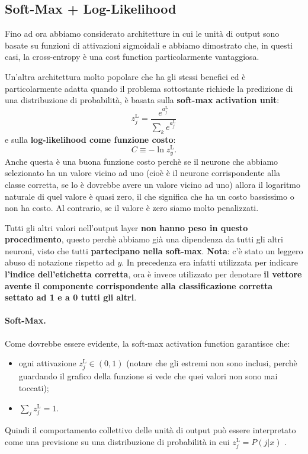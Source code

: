 \subsection{Soft-Max + Log-Likelihood}
Fino ad ora abbiamo considerato architetture in cui le unità di output sono basate su funzioni di attivazioni sigmoidali e abbiamo dimostrato che, in questi casi, la cross-entropy è una cost function particolarmente vantaggiosa.


Un'altra architettura molto popolare che ha gli stessi benefici ed è particolarmente adatta quando il problema sottostante richiede la predizione di una distribuzione di probabilità, è basata sulla \textbf{soft-max activation unit}:
\begin{equation}
    z^\text{L}_j=\frac{e^{a^\text{L}_j}}{\sum_ke^{a^\text{L}_j}}
\end{equation}
e sulla \textbf{log-likelihood come funzione costo}:
\begin{equation}
    C\equiv -\ln{z}^\text{L}_y.
\end{equation}
Anche questa è una buona funzione costo perchè se il neurone che abbiamo selezionato ha un valore vicino ad uno (cioè è il neurone corrispondente alla classe corretta, se lo è dovrebbe avere un valore vicino ad uno) allora il logaritmo naturale di quel valore è quasi zero, il che significa che ha un costo bassissimo o non ha costo. Al contrario, se il valore è zero siamo molto penalizzati.


Tutti gli altri valori nell'output layer \textbf{non hanno peso in questo procedimento}, questo perchè abbiamo già una dipendenza da tutti gli altri neuroni, visto che tutti \textbf{partecipano nella soft-max}. 
\newline
\newline
\textbf{Nota}: c'è stato un leggero abuso di notazione rispetto ad $y$. In precedenza era infatti utilizzata per indicare \textbf{l'indice  dell'etichetta corretta}, ora è invece utilizzato per denotare \textbf{il vettore avente il componente corrispondente alla classificazione corretta settato ad 1 e a 0 tutti gli altri}.
\newpage
\paragraph{Soft-Max.}Come dovrebbe essere evidente, la soft-max activation function garantisce che:
\begin{itemize}
    \item ogni attivazione $z^\text{L}_j\in(0,1)$ (notare che gli estremi non sono inclusi, perchè guardando il grafico della funzione si vede che quei valori non sono mai toccati);
    \item $\sum_jz^\text{L}_j=1$.
\end{itemize}
Quindi il comportamento collettivo delle unità di output può essere interpretato come una previsione su una distribuzione di probabilità in cui $z^\text{L}_j=P(j|x)$ .

